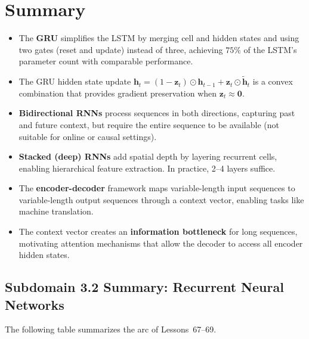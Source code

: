 \documentclass[11pt,a4paper]{article}
\begin{document}
\section{Summary}
\label{sec:summary}

\begin{itemize}
  \item The \textbf{GRU} simplifies the LSTM by merging cell and
    hidden states and using two gates (reset and update) instead
    of three, achieving $75\%$ of the LSTM's parameter count with
    comparable performance.
  \item The GRU hidden state update
    $\mathbf{h}_t = (1 - \mathbf{z}_t) \odot \mathbf{h}_{t-1} +
    \mathbf{z}_t \odot \tilde{\mathbf{h}}_t$ is a convex combination
    that provides gradient preservation when
    $\mathbf{z}_t \approx \mathbf{0}$.
  \item \textbf{Bidirectional RNNs} process sequences in both
    directions, capturing past and future context, but require the
    entire sequence to be available (not suitable for online or
    causal settings).
  \item \textbf{Stacked (deep) RNNs} add spatial depth by layering
    recurrent cells, enabling hierarchical feature extraction.  In
    practice, 2--4 layers suffice.
  \item The \textbf{encoder-decoder} framework maps variable-length
    input sequences to variable-length output sequences through a
    context vector, enabling tasks like machine translation.
  \item The context vector creates an \textbf{information bottleneck}
    for long sequences, motivating attention mechanisms that allow the
    decoder to access all encoder hidden states.
\end{itemize}

\subsection*{Subdomain 3.2 Summary: Recurrent Neural Networks}

The following table summarizes the arc of Lessons~67--69.
\end{document}
